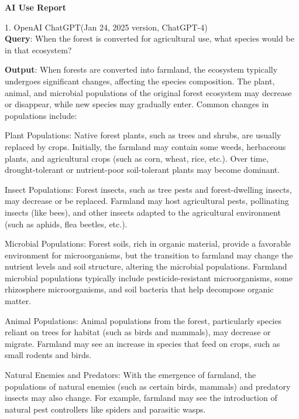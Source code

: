 \documentclass[12pt]{article}
\begin{document}
\newpage
\begin{center}
    \textbf{\Large{AI Use Report}}
\end{center}

1. OpenAI ChatGPT(Jan 24, 2025 version, ChatGPT-4)\\
\hspace{2em}\textbf{Query}: When the forest is converted for agricultural use, what species would be in that ecosystem?

\textbf{Output}: When forests are converted into farmland, the ecosystem typically undergoes significant changes, affecting the species composition. The plant, animal, and microbial populations of the original forest ecosystem may decrease or disappear, while new species may gradually enter. Common changes in populations include:

Plant Populations: Native forest plants, such as trees and shrubs, are usually replaced by crops. Initially, the farmland may contain some weeds, herbaceous plants, and agricultural crops (such as corn, wheat, rice, etc.). Over time, drought-tolerant or nutrient-poor soil-tolerant plants may become dominant.

Insect Populations: Forest insects, such as tree pests and forest-dwelling insects, may decrease or be replaced. Farmland may host agricultural pests, pollinating insects (like bees), and other insects adapted to the agricultural environment (such as aphids, flea beetles, etc.).

Microbial Populations: Forest soils, rich in organic material, provide a favorable environment for microorganisms, but the transition to farmland may change the nutrient levels and soil structure, altering the microbial populations. Farmland microbial populations typically include pesticide-resistant microorganisms, some rhizosphere microorganisms, and soil bacteria that help decompose organic matter.

Animal Populations: Animal populations from the forest, particularly species reliant on trees for habitat (such as birds and mammals), may decrease or migrate. Farmland may see an increase in species that feed on crops, such as small rodents and birds.

Natural Enemies and Predators: With the emergence of farmland, the populations of natural enemies (such as certain birds, mammals) and predatory insects may also change. For example, farmland may see the introduction of natural pest controllers like spiders and parasitic wasps.
\end{document}
